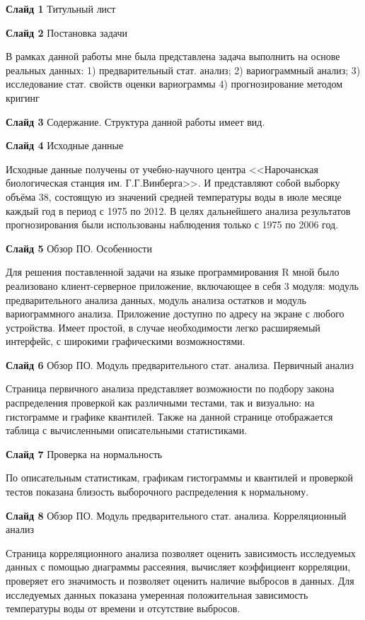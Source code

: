 \documentclass[a4paper,10pt]{report}
\begin{document}
\textbf{Слайд 1} Титульный лист

\textbf{Слайд 2} Постановка задачи

В рамках данной работы мне была представлена задача выполнить на основе реальных данных: 1) предварительный стат. анализ; 2) вариограммный анализ; 3) исследование стат. свойств оценки вариограммы 4) прогнозирование методом кригинг

\textbf{Слайд 3} Содержание. Структура данной работы имеет вид.

\textbf{Слайд 4} Исходные данные

Исходные данные получены от учебно-научного центра <<Нарочанская биологическая станция им. Г.Г.Винберга>>. И представляют собой выборку объёма 38, состоящую из значений средней температуры воды в июле месяце каждый год в период с 1975 по 2012. В целях дальнейшего анализа результатов прогнозирования были использованы наблюдения только с 1975 по 2006 год.

\textbf{Слайд 5} Обзор ПО. Особенности

Для решения поставленной задачи на языке программирования R мной было реализовано клиент-серверное приложение, включающее в себя 3 модуля: модуль предварительного анализа данных, модуль анализа остатков и модуль вариограммного анализа. Приложение доступно по адресу на экране с любого устройства. Имеет простой, в случае необходимости легко расширяемый интерфейс, с широкими графическими возможностями.

\textbf{Слайд 6} Обзор ПО. Модуль предварительного стат. анализа. Первичный анализ

Страница первичного анализа представляет возможности по подбору закона распределения проверкой как различными тестами, так и визуально: на гистограмме и графике квантилей. Также на данной странице отображается таблица с вычисленными описательными статистиками.

\textbf{Слайд 7} Проверка на нормальность

По описательным статистикам, графикам гистограммы и квантилей и проверкой тестов показана близость выборочного распределения к нормальному.

\textbf{Слайд 8} Обзор ПО. Модуль предварительного стат. анализа. Корреляционный анализ

Страница корреляционного анализа позволяет оценить зависимость исследуемых данных с помощью диаграммы рассеяния, вычисляет коэффициент корреляции, проверяет его значимость и позволяет оценить наличие выбросов в данных. Для исследуемых данных показана умеренная положительная зависимость температуры воды от времени и отсутствие выбросов.
\end{document}
